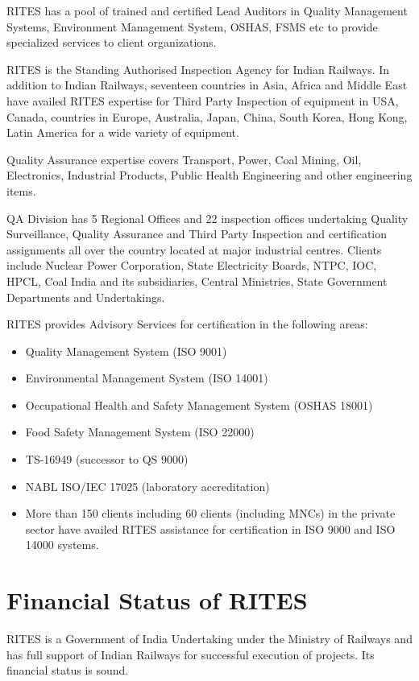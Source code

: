 RITES has a pool of trained and certified Lead Auditors in Quality Management Systems, Environment Management System, OSHAS, FSMS etc to provide specialized services to client organizations.

RITES is the Standing Authorised Inspection Agency for Indian Railways. In addition to Indian Railways, seventeen countries in Asia, Africa and Middle East have availed RITES expertise for Third Party Inspection of equipment in USA, Canada, countries in Europe, Australia, Japan, China, South Korea, Hong Kong, Latin America for a wide variety of equipment.  

Quality Assurance expertise covers Transport, Power, Coal Mining, Oil, Electronics, Industrial Products, Public Health Engineering and other engineering items. 

QA Division has 5 Regional Offices and 22 inspection offices undertaking Quality Surveillance, Quality Assurance and Third Party Inspection and certification assignments all over the country located at major industrial centres. Clients include Nuclear Power Corporation, State Electricity Boards, NTPC, IOC, HPCL, Coal India and its subsidiaries, Central Ministries, State Government Departments and Undertakings. 

RITES provides Advisory Services for certification in the following areas:
\begin{itemize}
\item Quality Management System (ISO 9001)
\item Environmental Management System (ISO 14001)
\item Occupational Health and Safety Management System (OSHAS 18001)
\item Food Safety Management System (ISO 22000)
\item TS-16949 (successor to QS 9000)
\item NABL ISO/IEC 17025 (laboratory accreditation)
\item More than 150 clients including 60 clients (including MNCs) in the private sector have availed RITES assistance for certification in ISO 9000 and ISO 14000 systems. 
\end{itemize}



\section{Financial Status of RITES}


RITES is a Government of India Undertaking under the Ministry of Railways and has full support of Indian Railways for
successful execution of projects. Its financial status is sound.




